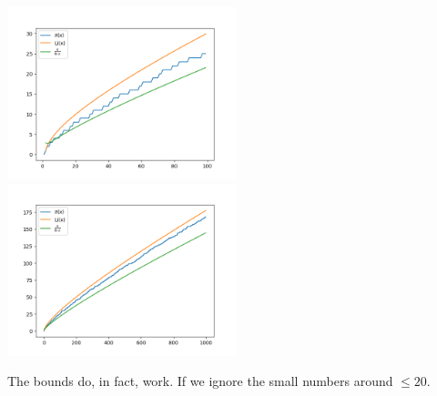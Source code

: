 \documentclass{article}
\begin{document}
  \noindent
  \includegraphics[width=0.5\textwidth]{bounds100}%
  \includegraphics[width=0.5\textwidth]{bounds1000}

  The bounds do, in fact, work.
  If we ignore the small numbers around $\leq 20$.
\end{document}
